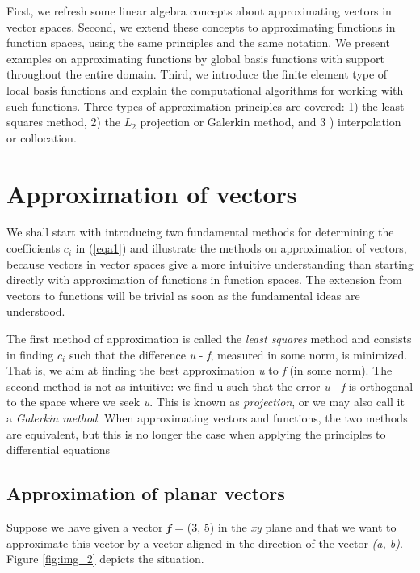 \documentclass[../main.tex]{subfiles}
\begin{document}
	First, we refresh some linear algebra concepts about approximating vectors in vector spaces. Second, we extend these concepts to approximating functions in function spaces, using the same principles and the same notation. We present examples on approximating functions by global basis functions with support throughout the entire domain. Third, we introduce the finite element type of local basis functions and explain the computational algorithms for working with such functions. Three types of approximation principles are covered: 1) the least squares method, 2) the $L_{2}$ projection or Galerkin method, and 3 ) interpolation or collocation.
\chapter{ Approximation of vectors}
	\label{chap:chap_1}
	\setcounter{page}{1}
	\noindent We shall start with introducing two fundamental methods for determining the
	coefficients $c_{i}$
	in (\ref{eqa1}) and illustrate the methods on approximation of vectors,
	because vectors in vector spaces give a more intuitive understanding than starting
	directly with approximation of functions in function spaces. The extension
	from vectors to functions will be trivial as soon as the fundamental ideas are
	understood.
	
	The first method of approximation is called the \textit{least squares} method and
	consists in finding $c_{i}$ such that the difference \textit{u} - \textit{f}, measured in some norm, is
	minimized. That is, we aim at finding the best approximation \textit{u} to \textit{f} (in some
	norm). The second method is not as intuitive: we find u such that the error
	\textit{u} - \textit{f} is orthogonal to the space where we seek \textit{u}. This is known as \textit{projection},
	or we may also call it a \textit{Galerkin method}. When approximating vectors and
	functions, the two methods are equivalent, but this is no longer the case when
	applying the principles to differential equations
	
	\section[Approximation of planar vectors]{Approximation of planar vectors}
	\label{sec:sec_1_1}
	\noindent Suppose we have given a vector \textit{\textbf{f}} = (3, 5) in the \textit{xy} plane and that we want to
	approximate this vector by a vector aligned in the direction of the vector \textit{(a, b)}.
	Figure \ref{fig:img_2} depicts the situation.
	
\end{document}
